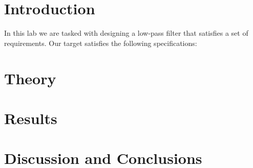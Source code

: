 \documentclass[11pt]{texMemo-gibbons}
\begin{document}
\maketitle

\section{Introduction}
\label{sec:introduction}

In this lab we are tasked with designing a low-pass
filter that satisfies a set of requirements. Our target
satisfies the following specifications:

\list{

}




\section{Theory}
\label{sec:theory}

\section{Results}
\label{sec:results}


\section{Discussion and Conclusions}
\label{sec:conclusions}
\end{document}
